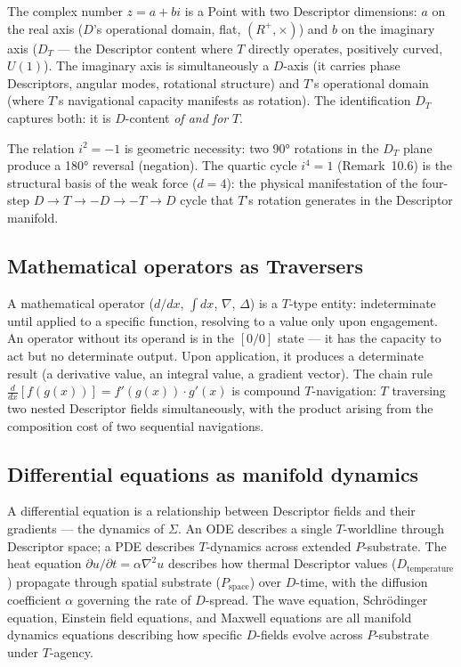 \documentclass[11pt,a4paper]{article}
\theoremstyle{definition}
\theoremstyle{remark}
\begin{document}
The complex number $z = a + bi$ is a Point with two Descriptor dimensions: $a$ on the real axis ($D$'s operational domain, flat, $(R^{+},\times)$) and $b$ on the imaginary axis ($D_{T}$ --- the Descriptor content where $T$ directly operates, positively curved, $U(1)$). The imaginary axis is simultaneously a $D$-axis (it carries phase Descriptors, angular modes, rotational structure) and $T$'s operational domain (where $T$'s navigational capacity manifests as rotation). The identification $D_{T}$ captures both: it is $D$-content \emph{of and for} $T$.

The relation $i^{2} = -1$ is geometric necessity: two 90° rotations in the $D_{T}$ plane produce a 180° reversal (negation). The quartic cycle $i^{4} = 1$ (Remark~10.6) is the structural basis of the weak force ($d = 4$): the physical manifestation of the four-step $D \to T \to -D \to -T \to D$ cycle that $T$'s rotation generates in the Descriptor manifold.

\subsection{Mathematical operators as Traversers}\label{subsec:operators-T}

A mathematical operator ($d/dx$, $\int dx$, $\nabla$, $\Delta$) is a $T$-type entity: indeterminate until applied to a specific function, resolving to a value only upon engagement. An operator without its operand is in the $[0/0]$ state --- it has the capacity to act but no determinate output. Upon application, it produces a determinate result (a derivative value, an integral value, a gradient vector). The chain rule $\frac{d}{dx}[f(g(x))] = f'(g(x)) \cdot g'(x)$ is compound $T$-navigation: $T$ traversing two nested Descriptor fields simultaneously, with the product arising from the composition cost of two sequential navigations.

\subsection{Differential equations as manifold dynamics}\label{subsec:DEs-dynamics}

A differential equation is a relationship between Descriptor fields and their gradients --- the dynamics of $\Sigma$. An ODE describes a single $T$-worldline through Descriptor space; a PDE describes $T$-dynamics across extended $P$-substrate. The heat equation $\partial u / \partial t = \alpha \nabla^{2} u$ describes how thermal Descriptor values ($D_{\text{temperature}}$) propagate through spatial substrate ($P_{\text{space}}$) over $D$-time, with the diffusion coefficient $\alpha$ governing the rate of $D$-spread. The wave equation, Schr\"odinger equation, Einstein field equations, and Maxwell equations are all manifold dynamics equations describing how specific $D$-fields evolve across $P$-substrate under $T$-agency.
\end{document}
